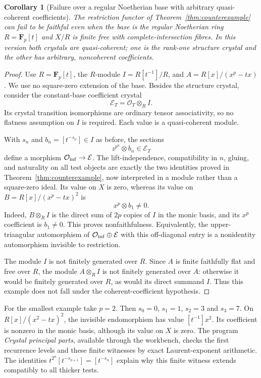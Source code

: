 \documentclass[11pt]{article}
\newcommand{\OO}{\mathcal O}\newcommand{\Fp}{\mathbf F_p}
\newtheorem{corollary}[theorem]{Corollary}
\theoremstyle{definition}\newtheorem{definition}[theorem]{Definition}
\theoremstyle{remark}\newtheorem{remark}[theorem]{Remark}
\begin{document}
\begin{corollary}[Failure over a regular Noetherian base with arbitrary quasi-coherent coefficients]\label{cor:noetherian-counterexample}
The restriction functor of Theorem~\ref{thm:counterexample} can fail to be faithful even when the base is the regular Noetherian ring $R=\Fp[t]$ and $X/R$ is finite free with complete-intersection fibres.  In this version both crystals are quasi-coherent; one is the rank-one structure crystal and the other has arbitrary, noncoherent coefficients.
\end{corollary}
\begin{proof}
Use $R=\Fp[t]$, the $R$-module $I=R[t^{-1}]/R$, and $A=R[x]/(x^p-tx)$.  We use no square-zero extension of the base.  Besides the structure crystal, consider the constant-base coefficient crystal
\[
                 \mathcal E_T=\OO_T\otimes_R I.
\]
Its crystal transition isomorphisms are ordinary tensor associativity, so no flatness assumption on $I$ is required.  Each value is a quasi-coherent module.

With $s_n$ and $b_n=[t^{-s_n}]\in I$ as before, the sections
\[
                    z^{p^n}\otimes b_n\in\mathcal E_T
\]
define a morphism $\OO_{\rm inf}\to\mathcal E$.  The lift-independence, compatibility in $n$, gluing, and naturality on all test objects are exactly the two identities proved in Theorem~\ref{thm:counterexample}, now interpreted in a module rather than a square-zero ideal.  Its value on $X$ is zero, whereas its value on $B=R[x]/(x^p-tx)^2$ is
\[
                         x^p\otimes b_1\ne0.
\]
Indeed, $B\otimes_R I$ is the direct sum of $2p$ copies of $I$ in the monic basis, and its $x^p$ coefficient is $b_1\ne0$.  This proves nonfaithfulness.  Equivalently, the upper-triangular automorphism of $\OO_{\rm inf}\oplus\mathcal E$ with this off-diagonal entry is a nonidentity automorphism invisible to restriction.

The module $I$ is not finitely generated over $R$.  Since $A$ is finite faithfully flat and free over $R$, the module $A\otimes_R I$ is not finitely generated over $A$: otherwise it would be finitely generated over $R$, as would its direct summand $I$.  Thus this example does not fall under the coherent-coefficient hypothesis.
\end{proof}

For the smallest example take $p=2$. Then $s_0=0$, $s_1=1$, $s_2=3$ and $s_3=7$. On $R[x]/(x^2-tx)^2$, the invisible endomorphism has value $[t^{-1}]x^2$. Its coefficient is nonzero in the monic basis, although its value on $X$ is zero. The program \emph{Crystal principal parts}, available through the workbench, checks the first recurrence levels and these finite witnesses by exact Laurent-exponent arithmetic. The identities $t^{2^n}[t^{-s_{n+1}}]=[t^{-s_n}]$ explain why this finite witness extends compatibly to all thicker tests.
\end{document}
